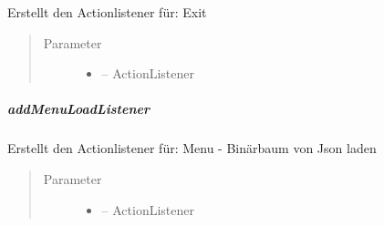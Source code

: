 \documentclass[letterpaper,10pt,ngerman]{sphinxmanual}
\begin{document}
\begin{fulllineitems}
\label{\detokenize{com/linuxluigi/edu/view/View:com.linuxluigi.edu.view.View.addMenuExitListener(ActionListener)}}
Erstellt den Actionlistener für: Exit
\begin{quote}\begin{description}
\item[{Parameter}] \leavevmode\begin{itemize}
\item {} 
 -- ActionListener

\end{itemize}

\end{description}\end{quote}

\end{fulllineitems}



\subparagraph{addMenuLoadListener}
\label{\detokenize{com/linuxluigi/edu/view/View:addmenuloadlistener}}

\begin{fulllineitems}
\label{\detokenize{com/linuxluigi/edu/view/View:com.linuxluigi.edu.view.View.addMenuLoadListener(ActionListener)}}
Erstellt den Actionlistener für: Menu - Binärbaum von Json laden
\begin{quote}\begin{description}
\item[{Parameter}] \leavevmode\begin{itemize}
\item {} 
 -- ActionListener

\end{itemize}

\end{description}\end{quote}

\end{fulllineitems}
\end{document}
